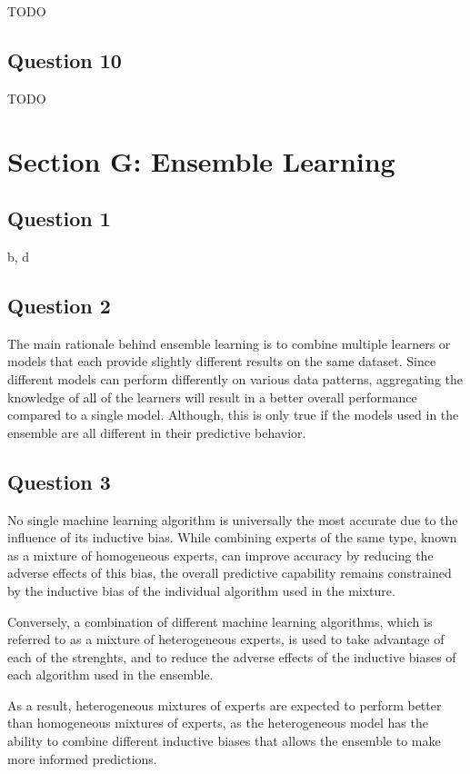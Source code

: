 \documentclass[10pt]{article}
\begin{document}
TODO

\subsection*{Question 10}

TODO

\section*{Section G: Ensemble Learning}

\subsection*{Question 1}

b, d

\subsection*{Question 2}

The main rationale behind ensemble learning is to combine multiple learners or models that each provide slightly
different results on the same dataset. Since different models can perform differently on various data patterns,
aggregating the knowledge of all of the learners will result in a better overall performance compared to a
single model. Although, this is only true if the models used in the ensemble are all different in their predictive behavior.

\subsection*{Question 3}

No single machine learning algorithm is universally the most accurate due to the influence of its inductive bias.
While combining experts of the same type, known as a mixture of homogeneous experts, can improve accuracy by reducing
the adverse effects of this bias, the overall predictive capability remains constrained by the inductive bias of the
individual algorithm used in the mixture.

Conversely, a combination of different machine learning algorithms, which is referred to as a mixture of heterogeneous experts,
is used to take advantage of each of the strenghts, and to reduce the adverse effects of the inductive
biases of each algorithm used in the ensemble.

As a result, heterogeneous mixtures of experts are expected to perform better than homogeneous mixtures
of experts, as the heterogeneous model has the ability to combine different inductive biases that allows the
ensemble to make more informed predictions.
\end{document}
